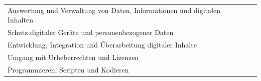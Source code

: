 \documentclass[
  ngerman,
  paper=a4,
,captions=tableheading
]{scrartcl}
\begin{document}
\begin{longtable}[]{@{}lll@{}}
\begin{minipage}[t]{0.72\columnwidth}
Auswertung und Verwaltung von Daten, Informationen und digitalen
Inhalten\strut
\end{minipage} & \begin{minipage}[t]{0.10\columnwidth}\raggedright
\strut
\end{minipage} & \begin{minipage}[t]{0.10\columnwidth}\raggedright
\strut
\end{minipage}\tabularnewline
\begin{minipage}[t]{0.72\columnwidth}\raggedright
Schutz digitaler Geräte und personenbezogener Daten\strut
\end{minipage} & \begin{minipage}[t]{0.10\columnwidth}\raggedright
\strut
\end{minipage} & \begin{minipage}[t]{0.10\columnwidth}\raggedright
\strut
\end{minipage}\tabularnewline
\begin{minipage}[t]{0.72\columnwidth}\raggedright
Entwicklung, Integration und Überarbeitung digitaler Inhalte\strut
\end{minipage} & \begin{minipage}[t]{0.10\columnwidth}\raggedright
\strut
\end{minipage} & \begin{minipage}[t]{0.10\columnwidth}\raggedright
\strut
\end{minipage}\tabularnewline
\begin{minipage}[t]{0.72\columnwidth}\raggedright
Umgang mit Urheberrechten und Lizenzen\strut
\end{minipage} & \begin{minipage}[t]{0.10\columnwidth}\raggedright
\strut
\end{minipage} & \begin{minipage}[t]{0.10\columnwidth}\raggedright
\strut
\end{minipage}\tabularnewline
\begin{minipage}[t]{0.72\columnwidth}\raggedright
Programmieren, Scripten und Kodieren\strut
\end{minipage} & \begin{minipage}[t]{0.10\columnwidth}\raggedright
\strut
\end{minipage} & \begin{minipage}[t]{0.10\columnwidth}\raggedright
\strut
\end{minipage}\tabularnewline
\bottomrule
\end{longtable}
\end{document}
